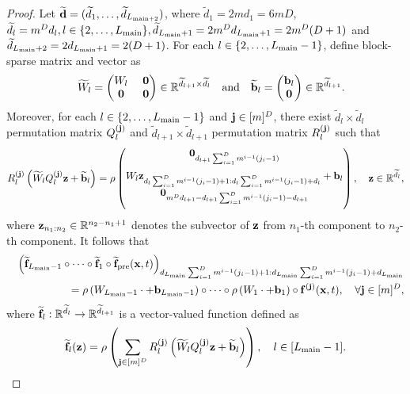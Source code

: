 \documentclass[twoside,11pt]{article}
\newcommand{\bb}{{\bf b}}
\newcommand{\bd}{{\bf d}}
\newcommand{\bff}{{\bf f}}
\newcommand{\bj}{{\bf j}}
\newcommand{\bx}{{\bf x}}
\newcommand{\bz}{{\bf z}}
\newcommand{\bbR}{{\mathbb R}}
\newcommand{\bean}{\setlength\arraycolsep{1pt}\begin{eqnarray*}}
\newcommand{\eean}{\end{eqnarray*}}
\begin{document}
\begin{proof}
Let $\widetilde \bd = (\widetilde d_{1},\ldots, \widetilde d_{L_{\rm main +2}})$, where $\widetilde d_{1} = 2md_{1} = 6 m D$, $\widetilde d_{l} = m^{D} d_{l}, l \in \{2,\ldots, L_{\rm main}\}, \widetilde d_{L_{\rm main}+1} = 2m^{D} d_{L_{\rm main}+1} = 2m^{D} (D + 1) $ and $\widetilde d_{L_{\rm main}+2} = 2 d_{L_{\rm main}+1} = 2 ( D + 1)$.
For each $l \in \{ 2, \ldots, L_{\rm main} - 1 \}$, define block-sparse matrix and vector as
\bean
&& \widetilde W_{l} = 
\begin{pmatrix}
W_{l} & \  \mathbf{0}
\\
\mathbf{0} & \ \mathbf{0}
\end{pmatrix} \in \bbR^{\widetilde d_{l+1} \times \widetilde d_{l}}
\quad \text{and} \quad
\widetilde \bb_{l} = 
\begin{pmatrix}
\bb_{l} 
\\
\mathbf{0}
\end{pmatrix} \in \bbR^{\widetilde d_{l+1}}.
\eean
Moreover, for each  $l \in \{ 2, \ldots, L_{\rm main} - 1 \}$ and $\bj \in [m]^{D}$, there exist $\widetilde d_{l} \times \widetilde d_{l}$ permutation matrix $Q_{l}^{(\bj)}$  and  $\widetilde d_{l+1} \times \widetilde d_{l+1}$ permutation matrix $R_{l}^{(\bj)}$ such that
\bean
R_{l}^{(\bj)}  \left(  \widetilde W_{l} Q_{l}^{(\bj)} \bz + \widetilde \bb_{l} \right) 
=
\rho \begin{pmatrix}
\mathbf{0}_{ d_{l+1} \sum_{i=1}^{D}  m^{i-1}(j_{i}-1) }
\medskip
\\
W_l \bz_{d_{l} \sum_{i=1}^{D}  m^{i-1}(j_{i}-1) + 1: 
d_{l} \sum_{i=1}^{D}  m^{i-1}(j_{i}-1) + d_{l}} + \bb_{l}
\\
\medskip
\mathbf{0}_{ m^{D} d_{l+1} - d_{l+1} \sum_{i=1}^{D}  m^{i-1}(j_{i}-1) -
 d_{l+1} }
\end{pmatrix},
\quad \bz \in \bbR^{\widetilde d_{l}},
\eean
where $\bz_{n_1:n_2} \in \bbR^{n_{2}-n_{1}+1}$ denotes the subvector of $\bz$ from $n_1$-th component to $n_2$-th component.
It follows that
\bean
&& \left( \widetilde \bff_{L_{\rm main}-1} \circ  \cdots  \circ  \widetilde \bff_{1} \circ \widetilde \bff_{\rm pre}(\bx,t) \right)_{ d_{L_{\rm main}} \sum_{i=1}^{D}  m^{i-1} ( j_{i}-1) +1 : d_{L_{\rm main}}  \sum_{i=1}^{D}  m^{i-1}( j_{i}-1) +d_{L_{\rm main}}  }
\\
&& \quad = \rho \left(  W_{L_{\rm main}-1} \cdot +  \bb_{L_{\rm main}-1} \right) \circ \cdots \circ
\rho \left(  W_{1} \cdot  +  \bb_{1} \right) \circ \bff^{( \bj )}(\bx,t) ,
\quad \forall \bj \in [m]^{D},
\eean
where $\widetilde \bff_{l} : \bbR^{\widetilde d_{l}} \rightarrow \bbR^{\widetilde d_{l+1}}$ is a vector-valued function defined as
\bean
\widetilde \bff_{l}(\bz) = \rho \left( \sum_{ \bj \in [m]^{D}} R_{l}^{(\bj)}  \left( 
\widetilde W_{l} Q_{l}^{(\bj)} \bz + \widetilde \bb_{l}
\right) \right), \quad l \in [L_{{\rm main}}-1].
\eean


\end{proof}
\end{document}

